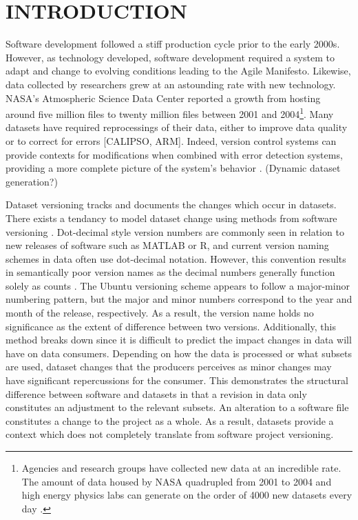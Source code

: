 
\chapter{INTRODUCTION}

Software development followed a stiff production cycle prior to the early 2000s.
However, as technology developed, software development required a system to adapt and change to evolving conditions leading to the Agile Manifesto.
Likewise, data collected by researchers grew at an astounding rate with new technology.
NASA's Atmospheric Science Data Center reported a growth from hosting around five million files to twenty million files between 2001 and 2004\footnote{Agencies and research groups have collected new data at an incredible rate.
The amount of data housed by NASA quadrupled from 2001 to 2004 \cite{Barkstrom_digitallibrary} and high energy physics labs can generate on the order of 4000 new datasets every day \cite{Flouris04clotho:transparent}.}.
Many datasets have required reprocessings of their data, either to improve data quality or to correct for errors [CALIPSO, ARM].
Indeed, version control systems can provide contexts for modifications when combined with error detection systems, providing a more complete picture of the system's behavior \cite{Fischer2003}.  (Dynamic dataset generation?)

Dataset versioning tracks and documents the changes which occur in datasets.
There exists a tendancy to model dataset change using methods from software versioning \cite{Chacon:2009:PG:1618548} \cite{cederqvist2002version} \cite{tichy1985rcs}.
Dot-decimal style version numbers are commonly seen in relation to new releases of software such as MATLAB or R, and current version naming schemes in data often use dot-decimal notation.
However, this convention results in semantically poor version names as the decimal numbers generally function solely as counts \cite{Dijkstra1994}.
The Ubuntu versioning scheme appears to follow a major-minor numbering pattern, but the major and minor numbers correspond to the year and month of the release, respectively.
As a result, the version name holds no significance as the extent of difference between two versions.
Additionally, this method breaks down since it is difficult to predict the impact changes in data will have on data consumers.
Depending on how the data is processed or what subsets are used, dataset changes that the producers perceives as minor changes may have significant repercussions for the consumer.
This demonstrates the structural difference between software and datasets in that a revision in data only constitutes an adjustment to the relevant subsets.
An alteration to a software file constitutes a change to the project as a whole.
As a result, datasets provide a context which does not completely translate from software project versioning.

